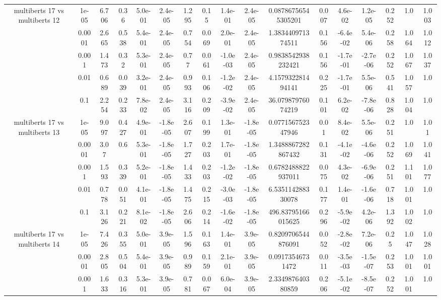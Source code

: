 \begin{tabular}{|c|c|c|c|c|c|c|c|c|c|c|c|c|c|c|c|c|}
\hline
\multirow{5}{*}{multiberts 17 vs multiberts 12} & 1e-05 & 6.706 & 0.36 & 5.0e-01 & 2.4e-05 & 1.295 & 0.15 & 1.4e-01 & 2.4e-05 & 0.08786756545305201 & 0.007 & 4.6e-02 & 1.2e-05 & 0.252 & 1.0 & 1.003 \\
 & 0.0001 & 2.665 & 0.538 & 5.4e-01 & 2.4e-05 & 0.754 & 0.069 & 2.0e-01 & 2.4e-05 & 1.383440971374511 & 0.156 & -6.4e-02 & 5.4e-06 & 0.258 & 1.064 & 1.012 \\
 & 0.001 & 1.473 & 0.32 & 5.3e-01 & 2.4e-05 & 0.77 & 0.061 & -1.0e-03 & 2.4e-05 & 0.9838542938232421 & 0.156 & -1.7e-01 & -2.7e-06 & 0.252 & 1.067 & 1.037 \\
 & 0.01 & 0.689 & 0.039 & 3.2e-01 & 2.4e-05 & 0.993 & 0.106 & -1.2e-02 & 2.4e-05 & 4.157932281494141 & 0.225 & -1.7e-01 & 5.5e-06 & 0.541 & 1.057 & 1.0 \\
 & 0.1 & 2.254 & 0.233 & 7.8e-02 & 2.4e-05 & 3.116 & 0.209 & -3.9e-02 & 2.4e-05 & 36.07987976074219 & 0.101 & 6.2e-02 & -7.8e-06 & 0.828 & 1.004 & 1.0 \\
\hline
\multirow{5}{*}{multiberts 17 vs multiberts 13} & 1e-05 & 9.097 & 0.427 & 4.9e-01 & -1.8e-05 & 2.607 & 0.199 & 1.3e-01 & -1.8e-05 & 0.077156752347946 & 0.01 & 8.4e-02 & 5.5e-06 & 0.251 & 1.0 & 1.01 \\
 & 0.0001 & 3.07 & 0.6 & 5.3e-01 & -1.8e-05 & 1.727 & 0.203 & 1.7e-01 & -1.8e-05 & 1.3488867282867432 & 0.131 & -4.1e-02 & -4.6e-06 & 0.252 & 1.069 & 1.041 \\
 & 0.001 & 1.593 & 0.339 & 5.2e-01 & -1.8e-05 & 1.433 & 0.203 & -1.2e-02 & -1.8e-05 & 0.6782488822937011 & 0.075 & 4.3e-02 & -6.9e-06 & 0.251 & 1.101 & 1.077 \\
 & 0.01 & 0.778 & 0.051 & 4.1e-01 & -1.8e-05 & 1.475 & 0.215 & -3.0e-03 & -1.8e-05 & 6.535114288330078 & 0.177 & 1.4e-01 & -1.6e-06 & 0.718 & 1.001 & 1.0 \\
 & 0.1 & 3.126 & 0.221 & 8.1e-02 & -1.8e-05 & 2.606 & 0.214 & -1.6e-02 & -1.8e-05 & 496.83795166015625 & 0.296 & -5.9e-02 & 4.2e-06 & 1.392 & 1.002 & 1.0 \\
\hline
\multirow{5}{*}{multiberts 17 vs multiberts 14} & 1e-05 & 7.426 & 0.355 & 5.0e-01 & 3.9e-05 & 1.596 & 0.163 & 1.4e-01 & 3.9e-05 & 0.8209706544876091 & 0.052 & -2.8e-02 & 7.2e-06 & 0.25 & 1.047 & 1.028 \\
 & 0.0001 & 2.805 & 0.504 & 5.4e-01 & 3.9e-05 & 0.989 & 0.159 & 2.1e-01 & 3.9e-05 & 0.09173546731472 & 0.011 & -3.5e-03 & -1.5e-07 & 0.253 & 1.001 & 1.001 \\
 & 0.001 & 1.633 & 0.316 & 5.3e-01 & 3.9e-05 & 0.781 & 0.067 & 6.0e-04 & 3.9e-05 & 2.334987640380859 & 0.206 & -5.1e-02 & -8.5e-07 & 0.252 & 1.001 & 1.0 \\

\end{tabular}
